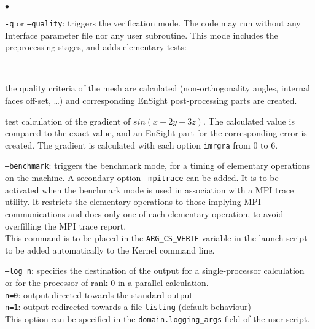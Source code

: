 {{{\begin{list}{$\bullet$}{}
\item \texttt{-q} or \texttt{--quality}: triggers the verification mode.
The code may run without any Interface parameter file nor any user subroutine.
This mode includes the preprocessing stages, and adds elementary tests:\\
\begin{list}{-}{}
\item the quality criteria of the mesh are calculated (non-orthogonality angles,
internal faces off-set, \ldots) and corresponding EnSight
post-processing parts are created.\\
\item test calculation of the gradient of $sin(x+2y+3z)$. The calculated
value is compared to the exact value, and an EnSight part for the
corresponding error is created. The gradient is calculated with each
option \texttt{imrgra} from $0$ to $6$.\\
\end{list}

\item \texttt{--benchmark}: triggers the benchmark mode, for a timing
of elementary operations on the machine. A secondary option
\texttt{--mpitrace} can be added. It is to be activated when the benchmark mode
is used in association with a MPI trace utility. It restricts the elementary
operations to those implying MPI communications and does only one of each
elementary operation, to avoid overfilling the MPI trace report.\\
This command is to be placed in the \texttt{ARG\_CS\_VERIF} variable
in the launch script to be added automatically to the Kernel command line.

\item \texttt{--log n}: specifies the destination of the output for a
single-processor calculation or for the processor of rank 0 in a parallel
calculation.\\
\hspace*{0.5cm}\texttt{n=0}: output directed towards the standard output\\
\hspace*{0.5cm}\texttt{n=1}: output redirected towards a file \texttt{listing}
(default behaviour)\\
This option can be specified in the \texttt{domain.logging\_args} field
of the user script.


\end{list}}}}
